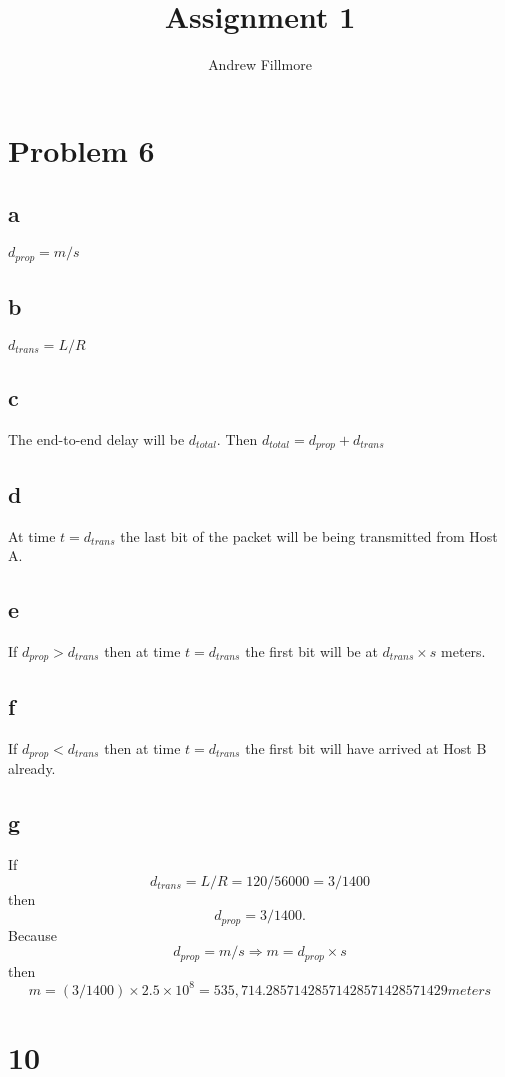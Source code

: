\documentclass[12pt,letterpaper]{article}
\author{Andrew Fillmore}
\title{Assignment 1}
\begin{document}
\maketitle
\section*{Problem 6}
\subsection*{a}

$d_{prop}=m/s$
\subsection*{b}

$d_{trans}=L/R$
\subsection*{c}

The end-to-end delay will be $d_{total}$.
Then $d_{total}=d_{prop}+d_{trans}$
\subsection*{d}
At time $t=d_{trans}$ the last bit of the packet will be being transmitted from Host A.
\subsection*{e}

If $d_{prop}>d_{trans}$ then at time $t=d_{trans}$ the first bit will be at $d_{trans}\times s$ meters.
\subsection*{f}

If $d_{prop}<d_{trans}$ then at time $t=d_{trans}$ the first bit will have arrived at Host B already.
\subsection*{g}

If
$$d_{trans}=L/R=120/56000=3/1400$$
then
$$d_{prop}=3/1400.$$
Because
$$d_{prop}=m/s\Rightarrow m=d_{prop}\times s$$
then
$$m=(3/1400)\times2.5\times10^{8}=535,714.28571428571428571428571429meters$$
\section*{10}
\end{document}
